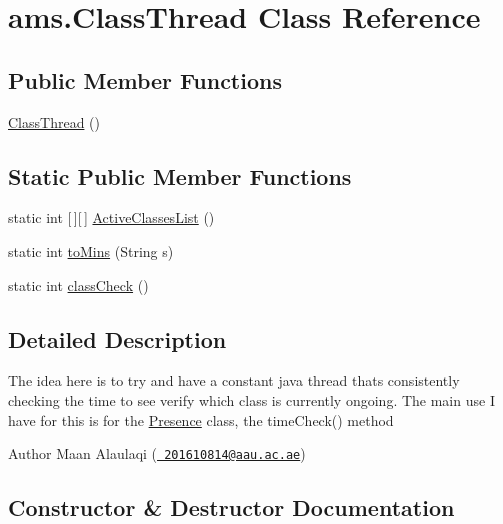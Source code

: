 \hypertarget{classams_1_1_class_thread}{}\section{ams.\+Class\+Thread Class Reference}
\label{classams_1_1_class_thread}
\subsection*{Public Member Functions}
\begin{DoxyCompactItemize}
\item 
\mbox{\hyperlink{classams_1_1_class_thread_a507ccd0861e5ef4b3d9cf312052b7f0e}{Class\+Thread}} ()
\end{DoxyCompactItemize}
\subsection*{Static Public Member Functions}
\begin{DoxyCompactItemize}
\item 
static int \mbox{[}$\,$\mbox{]}\mbox{[}$\,$\mbox{]} \mbox{\hyperlink{classams_1_1_class_thread_addadbfedff6d9cc822345caa787ad587}{Active\+Classes\+List}} ()
\item 
static int \mbox{\hyperlink{classams_1_1_class_thread_a6cf57979f8aee94a4b4c5d46525bb76d}{to\+Mins}} (String s)
\item 
static int \mbox{\hyperlink{classams_1_1_class_thread_a7b05781a31721bb8ee9f4c40203bef72}{class\+Check}} ()
\end{DoxyCompactItemize}


\subsection{Detailed Description}
The idea here is to try and have a constant java thread that\textquotesingle{}s consistently checking the time to see verify which class is currently ongoing. The main use I have for this is for the \mbox{\hyperlink{classams_1_1_presence}{Presence}} class, the time\+Check() method

\begin{DoxyAuthor}{Author}
Maan Alaulaqi (\href{mailto:201610814@aau.ac.ae}{\texttt{ 201610814@aau.\+ac.\+ae}}) 
\end{DoxyAuthor}


\subsection{Constructor \& Destructor Documentation}
\mbox{\label{classams_1_1_class_thread_a507ccd0861e5ef4b3d9cf312052b7f0e}} 
